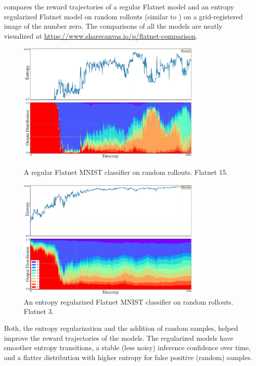  compares the reward trajectories of a regular Flatnet model and an entropy regularized Flatnet model on random rollouts (similar to ) on a grid-registered image of the number zero.
The comparisons of all the models are neatly visualized at \url{https://www.sharecanvas.io/p/flatnet-comparison}.

\begin{figure}[H]
    \centering
    \includegraphics[width=0.8\textwidth]{images/Flatnet 15.pdf}
    \caption[A regular Flatnet MNIST classifier on random rollouts.]{A regular Flatnet MNIST classifier on random rollouts. Flatnet 15.}
    \vspace{12pt}
    \includegraphics[width=0.8\textwidth]{images/Flatnet 3.pdf}
    \caption[An entropy regularized Flatnet MNIST classifier on random rollouts.]{An entropy regularized Flatnet MNIST classifier on random rollouts. Flatnet 3.}
    \label{fig:flatnet-comparison}
\end{figure}

Both, the entropy regularization and the addition of random samples, helped improve the reward trajectories of the models.
The regularized models have smoother entropy transitions, a stable (less noisy) inference confidence over time, and a flatter distribution with higher entropy for false positive (random) samples.


